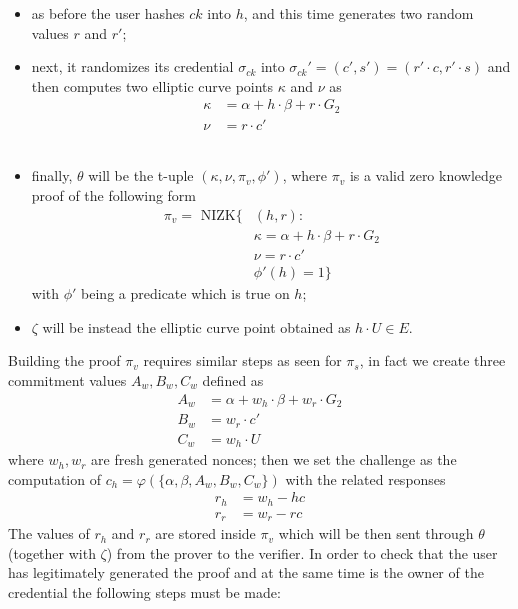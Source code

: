 \documentclass[twocolumn]{article}
\begin{document}
\begin{itemize}
    \item as before the user hashes $ck$ into $h$, and this time generates two random values $r$ and $r'$;\\
    \item next, it randomizes its credential $\sigma_{ck}$ into $\sigma_{ck}' = (c', s') = (r'\cdot c, r'\cdot s)$ and then computes two elliptic curve points $\kappa$ and $\nu$ as
    \begin{align*}
        \kappa &= \alpha + h\cdot\beta + r\cdot G_2\\
        \nu &= r \cdot c'
    \end{align*}\\
    \item finally, $\theta$ will be the t-uple $(\kappa, \nu, \pi_v, \phi')$, where $\pi_v$ is a valid zero knowledge proof of the following form
    \begin{align*}
        \pi_v = \text{ NIZK}\{&(h, r): \\
        &\kappa = \alpha + h\cdot\beta + r\cdot G_2\\
        &\nu = r \cdot c' \\
        &\phi'(h)=1\}
    \end{align*}
    with $\phi'$ being a predicate which is true on $h$; 
    \item $\zeta$ will be instead the elliptic curve point obtained as $h\cdot U \in E$.
\end{itemize}
Building the proof $\pi_v$ requires similar steps as seen for $\pi_s$, in fact we create three commitment values $A_w, B_w, C_w$ defined as
\begin{align*}
    A_w &= \alpha + w_h\cdot \beta + w_r \cdot G_2 \\
    B_w &= w_r\cdot c' \\
    C_w &= w_h\cdot U
\end{align*}
where $w_h, w_r$ are fresh generated nonces; then we set the challenge as the computation of $c_h=\varphi(\{\alpha,\beta,A_w,B_w,C_w\})$ with the related responses 
\begin{align*}
    r_h &= w_h - hc \\
    r_r &= w_r - rc
\end{align*}
The values of $r_h$ and $r_r$ are stored inside $\pi_v$ which will be then sent through $\theta$ (together with $\zeta$) from the prover to the verifier. In order to check that the user has legitimately generated the proof and at the same time is the owner of the credential the following steps must be made:
\end{document}
